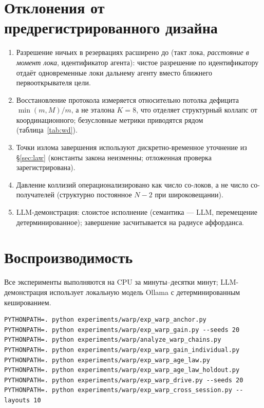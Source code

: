 \documentclass{article}
\begin{document}
\appendix

\section{Отклонения от предрегистрированного дизайна}
\label{app:deviations}
\begin{enumerate}[leftmargin=20pt,itemsep=2pt,topsep=2pt]
\item Разрешение ничьих в резервациях расширено до (такт лока,
  \emph{расстояние в момент лока}, идентификатор агента): чистое
  разрешение по идентификатору отдаёт одновременные локи дальнему
  агенту вместо ближнего первооткрывателя цели.
\item Восстановление протокола измеряется относительно потолка
  дефицита $\min(m,M)/m$, а не эталона $K{=}8$, что отделяет
  структурный коллапс от координационного; безусловные метрики
  приводятся рядом (таблица~\ref{tab:wd}).
\item Точки излома завершения используют дискретно-временное
  уточнение из \S\ref{sec:law} (константы закона неизменны;
  отложенная проверка зарегистрирована).
\item Давление коллизий операционализировано как число со-локов, а не
  число со-получателей (структурно постоянное $N{-}2$ при
  широковещании).
\item LLM-демонстрация: слоистое исполнение (семантика --- LLM,
  перемещение детерминированное); завершение засчитывается на радиусе
  аффорданса.
\end{enumerate}

\section{Воспроизводимость}
\label{app:repro}
Все эксперименты выполняются на CPU за минуты--десятки минут;
LLM-демонстрация использует локальную модель Ollama с
детерминированным кешированием.
\begin{verbatim}
PYTHONPATH=. python experiments/warp/exp_warp_anchor.py
PYTHONPATH=. python experiments/warp/exp_warp_gain.py --seeds 20
PYTHONPATH=. python experiments/warp/analyze_warp_chains.py
PYTHONPATH=. python experiments/warp/exp_warp_gain_individual.py
PYTHONPATH=. python experiments/warp/exp_warp_age_law.py
PYTHONPATH=. python experiments/warp/exp_warp_age_law_holdout.py
PYTHONPATH=. python experiments/warp/exp_warp_drive.py --seeds 20
PYTHONPATH=. python experiments/warp/exp_warp_cross_session.py --layouts 10
\end{verbatim}
\end{document}
